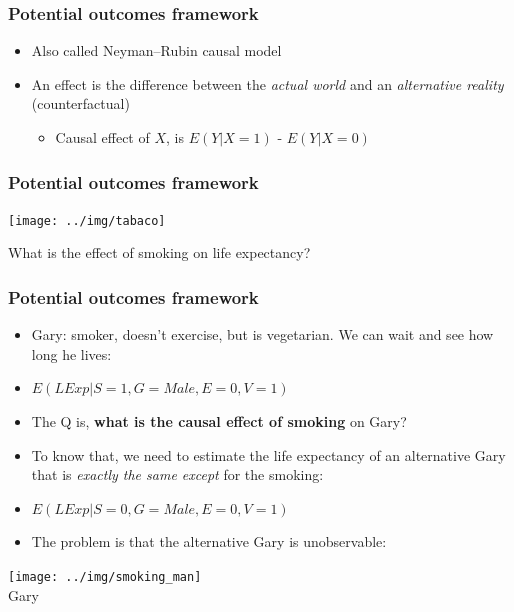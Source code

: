 \documentclass[aspectratio=43]{beamer}
\begin{document}
\begin{frame}
\frametitle{Potential outcomes framework}
\centering

\begin{itemize}
  \item Also called Neyman–Rubin causal model
  \item An effect is the difference between the \textit{actual world} and an \textit{alternative reality} (counterfactual)
  \begin{itemize}
    \item Causal effect of $X$, is $E(Y|X = 1)$ - $E(Y|X = 0)$
  \end{itemize}
\end{itemize}

\end{frame}

\begin{frame}
\frametitle{Potential outcomes framework}
\centering

\texttt{[image: ../img/tabaco]}

\vspace{10pt}

What is the effect of smoking on life expectancy?

\end{frame}

\begin{frame}
\frametitle{Potential outcomes framework}
\centering


\begin{minipage}{0.7\textwidth}\centering
  \begin{itemize}\linespread{2}
    \item<1-> Gary: smoker, doesn't exercise, but is vegetarian. We can wait and see how long he lives:
    \item<1->[] {\small $E(LExp|S=1, G=Male, E=0, V=1)$}
    \item<2-> The Q is, \textbf{what is the causal effect of smoking} on Gary?
    \item<3-> To know that, we need to estimate the life expectancy of an alternative Gary that is \textit{exactly the same except} for the smoking:
    \item<3->[] {\small $E(LExp|S=0, G=Male, E=0, V=1)$}
    \item<4-> The problem is that the alternative Gary is unobservable: 
  \end{itemize}
\end{minipage}\hfill
\begin{minipage}{0.3\textwidth}\centering
\texttt{[image: ../img/smoking\_man]}\\Gary
\end{minipage}


\end{frame}
\end{document}
